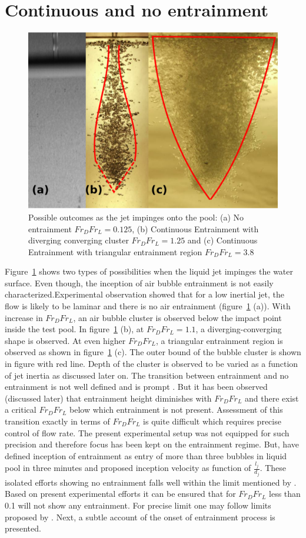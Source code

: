 \section{Continuous and no entrainment}
\begin{figure}
	\centering
	\includegraphics[width=0.75\linewidth]{chapters/jetPool/Figure8}
	\caption{Possible outcomes as the jet impinges onto the pool: (a) No entrainment $Fr_DFr_L = 0.125$, (b) Continuous Entrainment with diverging converging cluster $Fr_DFr_L = 1.25$ and (c) Continuous Entrainment with triangular entrainment region  $Fr_DFr_L = 3.8$}
	\label{Figure::transition}
\end{figure}
Figure~\ref{Figure::transition} shows two types of possibilities when the liquid jet impinges the water surface. Even though, the inception of air bubble entrainment is not easily characterized.Experimental observation showed that for a low inertial jet, the flow is likely to be laminar and there is no air entrainment (figure~\ref{Figure::transition} (a)). With increase in $Fr_DFr_L$, an air bubble cluster is observed below the impact point inside the test pool. In figure~\ref{Figure::transition} (b), at $Fr_DFr_L = 1.1$, a diverging-converging shape is observed. At even higher $Fr_DFr_L$, a triangular entrainment region is observed as shown in figure~\ref{Figure::transition} (c). The outer bound of the bubble cluster is shown in figure with red line. Depth of the cluster is observed to be varied as a function of jet inertia as discussed later on. The transition between entrainment and no entrainment is not well defined and is prompt \citep{Harby2014,ervine1980effect}. But it has been observed (discussed later) that entrainment height diminishes with $Fr_DFr_L$ and there exist a critical $Fr_DFr_L$ below which entrainment is not present. Assessment of this transition exactly in terms of $Fr_DFr_L$ is quite difficult which requires precise control of flow rate. The present experimental setup was not equipped for such precision and therefore focus has been kept on the entrainment regime. But, \citet{Harby2014} have defined inception of entrainment as entry of more than three bubbles in liquid pool in three minutes and proposed inception velocity as function of $\frac{l_j}{d_j}$. These isolated efforts showing no entrainment falls well within the limit mentioned by \citet{Harby2014}. Based on present experimental efforts it can be ensured that for $Fr_DFr_L$ less than 0.1 will not show any entrainment. For precise limit one may follow limits proposed by \citet{Harby2014}. Next, a subtle account of the onset of entrainment process is presented.

